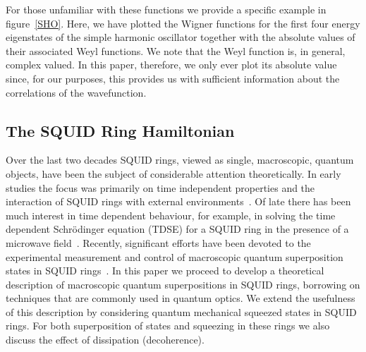 \documentclass[twocolumn,a4paper,superscriptaddress,showpacs,floatfix,pra]{revtex4}
\begin{document}
For  those  unfamiliar with  these  functions  we  provide a  specific
example  in  figure~\ref{SHO}.  Here,   we  have  plotted  the  Wigner
functions for the first four energy eigenstates of the simple harmonic
oscillator together with the  absolute values of their associated Weyl
functions.  We note  that the  Weyl function  is, in  general, complex
valued. In this paper, therefore, we only ever plot its absolute value
since, for our purposes,  this provides us with sufficient information
about the correlations of the wavefunction.

\subsection*{The SQUID Ring Hamiltonian}

Over the last two decades  SQUID rings, viewed as single, macroscopic,
quantum  objects,  have been  the  subject  of considerable  attention
theoretically.  In  early studies  the  focus  was  primarily on  time
independent  properties  and  the  interaction  of  SQUID  rings  with
external  environments~\cite{Spi1992,SrivastavaW87,LeggettCDFGZ87}. Of
late there  has been  much interest in  time dependent  behaviour, for
example, in solving the time dependent Schr\"{o}dinger equation (TDSE)
for    a   SQUID    ring   in    the   presence    of    a   microwave
field~\cite{ClarkDREPPWWS98,DigginsWCPPRS97-b}.  Recently, significant
efforts have been devoted  to the experimental measurement and control
of    macroscopic    quantum    superposition    states    in    SQUID
rings~\cite{FriedmanPCTL00}.  In this  paper we  proceed to  develop a
theoretical description of macroscopic quantum superpositions in SQUID
rings,  borrowing on  techniques  that are  commonly  used in  quantum
optics. We  extend the usefulness  of this description  by considering
quantum  mechanical   squeezed  states   in  SQUID  rings.   For  both
superposition of states  and squeezing in these rings  we also discuss
the effect of dissipation (decoherence).
\end{document}
